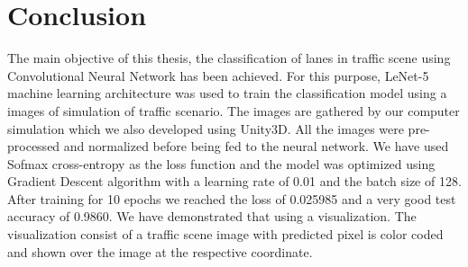 \par
\section{Conclusion}
The main objective of this thesis, the classification of lanes in traffic scene using Convolutional Neural Network has been achieved. For this purpose, LeNet-5 machine learning architecture was used to train the classification model using a images of simulation of traffic scenario. The images are gathered by our computer simulation which we also developed using Unity3D. All the images were pre-processed and normalized before being fed to the neural network. We have used Sofmax cross-entropy as the loss function and the model was optimized using Gradient Descent algorithm with a learning rate of 0.01 and the batch size of 128. After training for 10 epochs we reached the loss of 0.025985 and a very good test accuracy of 0.9860.
We have demonstrated that using a visualization. The visualization consist of a traffic scene image with predicted pixel is color coded and shown over the image at the respective coordinate.

